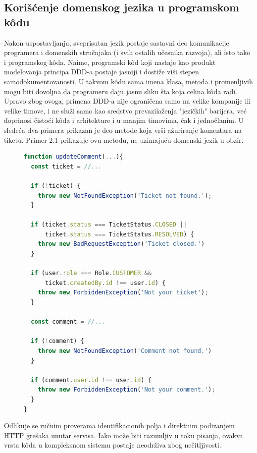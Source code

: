 \documentclass[12pt,oneside]{memoir}
\begin{document}
\subsection{Korišćenje domenskog jezika u programskom k\^{o}du}
\label{sec:dddukodu}
Nakon uspostavljanja, sveprisutan jezik postaje sastavni deo komunikacije programera i domenskih stručnjaka (i svih ostalih učesnika razvoja), ali isto tako i programskog k\^{o}da. Naime, programski k\^{o}d koji nastaje kao produkt modelovanja principa DDD-a postaje jasniji i dostiže viši stepen samodokumentovanosti. U takvom k\^{o}du sama imena klasa, metoda i promenljivih mogu biti dovoljna da programeru daju jasnu sliku šta koja celina k\^{o}da radi. Upravo zbog ovoga, primena DDD-a nije ograničena samo na velike kompanije ili velike timove, i ne služi samo kao sredstvo prevazilaženja "jezičkih" barijera, već doprinosi čistoći k\^{o}da i arhitekture i u manjim timovima, čak i jednočlanim. U sledeća dva primera prikazan je deo metode koja vrši ažuriranje komentara na tiketu. Primer 2.1 prikazuje ovu metodu, ne uzimajuću domenski jezik u obzir.


\begin{figure}[h]
\begin{lstlisting}[language=JavaScript, style=ES6, caption={K\^{o}d koji nije na domenskom jeziku}]
function updateComment(...){
  const ticket = //...
  
  if (!ticket) {
    throw new NotFoundException('Ticket not found.');
  }

  if (ticket.status === TicketStatus.CLOSED ||
      ticket.status === TicketStatus.RESOLVED) {
    throw new BadRequestException('Ticket closed.')
  }

  if (user.role === Role.CUSTOMER &&
      ticket.createdBy.id !== user.id) {
    throw new ForbiddenException('Not your ticket');
  }
  
  const comment = //...
  
  if (!comment) {
    throw new NotFoundException('Comment not found.')
  }
  
  if (comment.user.id !== user.id) {
    throw new ForbiddenException('Not your comment.');
  }
}
\end{lstlisting}
\end{figure}
\newpage
Odlikuje se ručnim proverama identifikacionih polja i direktnim podizanjem HTTP grešaka unutar servisa. Iako može biti razumljiv u toku pisanja, ovakva vrsta k\^{o}da u kompleksnom sistemu postaje neodrživa zbog nečitljivosti.
\end{document}

